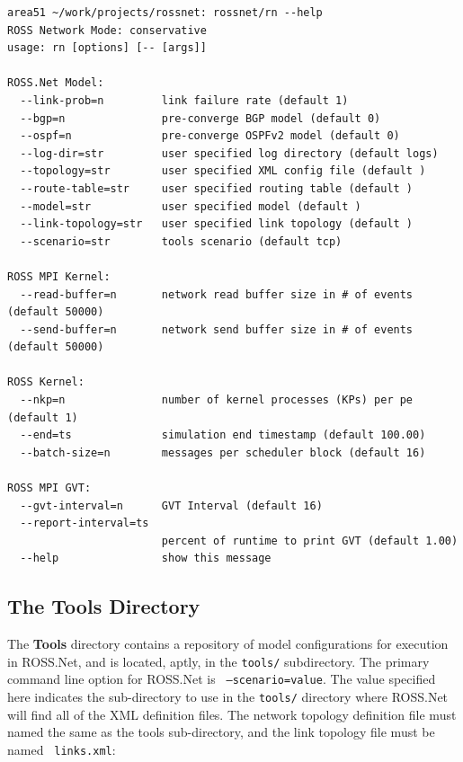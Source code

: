 \documentclass[12pt]{article}
\begin{document}
\begin{small}
\begin{verbatim}
area51 ~/work/projects/rossnet: rossnet/rn --help
ROSS Network Mode: conservative
usage: rn [options] [-- [args]]

ROSS.Net Model:
  --link-prob=n         link failure rate (default 1)
  --bgp=n               pre-converge BGP model (default 0)
  --ospf=n              pre-converge OSPFv2 model (default 0)
  --log-dir=str         user specified log directory (default logs)
  --topology=str        user specified XML config file (default )
  --route-table=str     user specified routing table (default )
  --model=str           user specified model (default )
  --link-topology=str   user specified link topology (default )
  --scenario=str        tools scenario (default tcp)

ROSS MPI Kernel:
  --read-buffer=n       network read buffer size in # of events (default 50000)
  --send-buffer=n       network send buffer size in # of events (default 50000)

ROSS Kernel:
  --nkp=n               number of kernel processes (KPs) per pe (default 1)
  --end=ts              simulation end timestamp (default 100.00)
  --batch-size=n        messages per scheduler block (default 16)

ROSS MPI GVT:
  --gvt-interval=n      GVT Interval (default 16)
  --report-interval=ts
                        percent of runtime to print GVT (default 1.00)
  --help                show this message
\end{verbatim}
\end{small}

\subsection{The Tools Directory}

The {\bf Tools} directory contains a repository of model configurations for
execution in ROSS.Net, and is located, aptly, in the {\tt tools/}
subdirectory.  The primary command line option for ROSS.Net is {\tt
  --scenario=value}.  The value specified here indicates the sub-directory to
use in the {\tt tools/} directory where ROSS.Net will find all of the XML
definition files.  The network topology definition file must named the same as
the tools sub-directory, and the link topology file must be named {\tt
  links.xml}:
\end{document}
